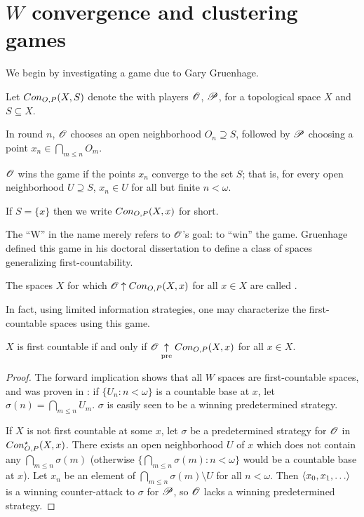 
\chapter{$W$ convergence and clustering games}

We begin by investigating a game due to Gary Gruenhage.

\begin{game}
  Let $Con_{O,P}(X,S)$ denote the  with
  players $\mathscr{O}$, $\mathscr{P}$, for a topological space $X$ and $S\subseteq X$.

  In round $n$, $\mathscr{O}$ chooses an open neighborhood $O_n\supseteq S$, followed
  by $\mathscr{P}$ choosing a point $x_n\in \bigcap_{m\leq n}O_m$.

  $\mathscr{O}$ wins the game if the points $x_n$ converge to the set $S$; that is,
  for every open neighborhood $U\supseteq S$, $x_n\in U$ for
  all but finite $n<\omega$.

  If $S=\{x\}$ then we write $Con_{O,P}(X,x)$ for short.
\end{game}

The ``W'' in the name merely refers to $\mathscr{O}$'s goal: to ``win'' the game.
Gruenhage defined this game in his doctoral dissertation to define a class
of spaces generalizing first-countability. \cite{MR0413049}

\begin{defn}
  The spaces $X$ for which $\mathscr{O} \uparrow Con_{O,P}(X,x)$ for all $x\in X$ are
  called .
\end{defn}

In fact, using limited information strategies, one may characterize the
first-countable spaces using this game.

\begin{prop}
  $X$ is first countable
    if and only if
  $\mathscr{O} \underset{\text{pre}}{\uparrow} Con_{O,P}(X,x)$ for all $x\in X$.
\end{prop}

\begin{proof}
  The forward implication shows that all $W$ spaces are first-countable spaces,
  and was proven in \cite{MR0413049}: if $\{U_n:n<\omega\}$ is a countable
  base at $x$, let $\sigma(n)=\bigcap_{m\leq n} U_m$. $\sigma$ is easily seen
  to be a winning predetermined strategy.

  If $X$ is not first countable at some $x$, let $\sigma$ be a
  predetermined strategy for $\mathscr{O}$ in $Con_{O,P}^\star(X,x)$. There exists
  an open neighborhood $U$ of $x$ which does not contain any
  $\bigcap_{m\leq n}\sigma(m)$ (otherwise
  $\{\bigcap_{m\leq n}\sigma(m):n<\omega\}$ would be a countable base at $x$).
  Let $x_n$ be an element of $\bigcap_{m\leq n}\sigma(m)\setminus U$ for all
  $n<\omega$. Then $\<x_0,x_1,\dots\>$ is a winning counter-attack to $\sigma$
  for $\mathscr{P}$, so $\mathscr{O}$ lacks a winning predetermined strategy.
\end{proof}

